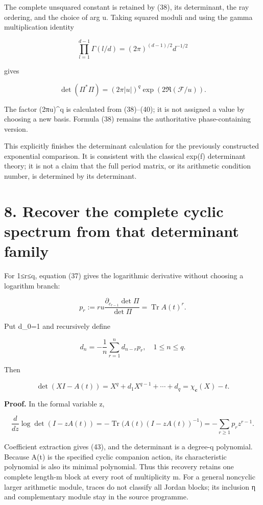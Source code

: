 \documentclass[
  11pt,
]{article}
\begin{document}
The complete unsquared constant is retained by (38), its determinant,
the ray ordering, and the choice of arg u. Taking squared moduli and
using the gamma multiplication identity

\[
\prod_{l=1}^{d-1}\Gamma(l/d)=(2\pi)^{(d-1)/2}d^{-1/2}
\tag{40}
\]

gives

\[
\boxed{\det(\Pi^*\Pi)
 =(2\pi|u|)^q\exp(2\Re(\mathcal F/u)).}
\tag{41}
\]

The factor (2π\textbar u\textbar)\^{}q is calculated from (38)--(40); it
is not assigned a value by choosing a new basis. Formula (38) remains
the authoritative phase-containing version.

This explicitly finishes the determinant calculation for the previously
constructed exponential comparison. It is consistent with the classical
exp(f) determinant theory; it is not a claim that the full period
matrix, or its arithmetic condition number, is determined by its
determinant.

\section{8. Recover the complete cyclic spectrum from that determinant
family}\label{recover-the-complete-cyclic-spectrum-from-that-determinant-family}

For 1≤r≤q, equation (37) gives the logarithmic derivative without
choosing a logarithm branch:

\[
p_r:=r u\frac{\partial_{c_{r-1}}\det\Pi}{\det\Pi}
 =\operatorname{Tr}A(t)^r.
\tag{42}
\]

Put d\_0=1 and recursively define

\[
d_n=-\frac1n\sum_{r=1}^n d_{n-r}p_r,
\quad1\le n\le q.
\tag{43}
\]

Then

\[
\boxed{\det(XI-A(t))=X^q+d_1X^{q-1}+\cdots+d_q
 =\chi_{\mathbf c}(X)-t.}
\tag{44}
\]

\textbf{Proof.} In the formal variable z,

\[
\frac{d}{dz}\log\det(I-zA(t))
 =-\operatorname{Tr}\bigl(A(t)(I-zA(t))^{-1}\bigr)
 =-\sum_{r\ge1}p_rz^{r-1}.
\tag{45}
\]

Coefficient extraction gives (43), and the determinant is a degree-q
polynomial. Because A(t) is the specified cyclic companion action, its
characteristic polynomial is also its minimal polynomial. Thus this
recovery retains one complete length-m block at every root of
multiplicity m. For a general noncyclic larger arithmetic module, traces
do not classify all Jordan blocks; its inclusion η and complementary
module stay in the source programme.
\end{document}
